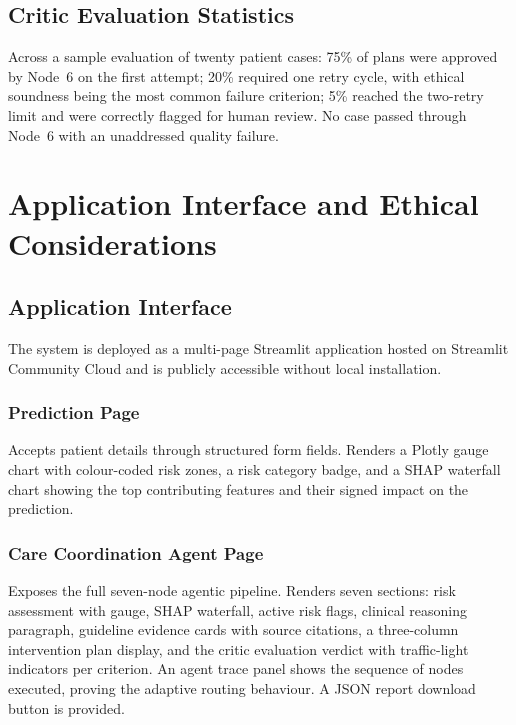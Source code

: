 \documentclass[12pt, a4paper]{report}
\begin{document}
\section{Critic Evaluation Statistics}

Across a sample evaluation of twenty patient cases: 75\% of plans were approved by Node~6 on the first attempt; 20\% required one retry cycle, with ethical soundness being the most common failure criterion; 5\% reached the two-retry limit and were correctly flagged for human review. No case passed through Node~6 with an unaddressed quality failure.

\chapter{Application Interface and Ethical Considerations}

\section{Application Interface}

The system is deployed as a multi-page Streamlit application hosted on Streamlit Community Cloud and is publicly accessible without local installation.

\subsection{Prediction Page}

Accepts patient details through structured form fields. Renders a Plotly gauge chart with colour-coded risk zones, a risk category badge, and a SHAP waterfall chart showing the top contributing features and their signed impact on the prediction.

\subsection{Care Coordination Agent Page}

Exposes the full seven-node agentic pipeline. Renders seven sections: risk assessment with gauge, SHAP waterfall, active risk flags, clinical reasoning paragraph, guideline evidence cards with source citations, a three-column intervention plan display, and the critic evaluation verdict with traffic-light indicators per criterion. An agent trace panel shows the sequence of nodes executed, proving the adaptive routing behaviour. A JSON report download button is provided.
\end{document}
